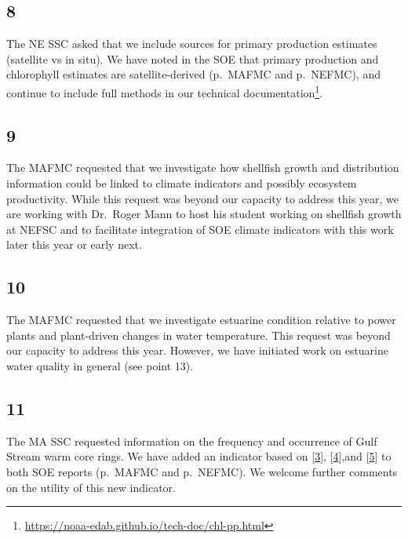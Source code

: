 \documentclass[
  10pt,
]{article}
\begin{document}
\hypertarget{section-7}{%
\subsection{8}\label{section-7}}

The NE SSC asked that we include sources for primary production
estimates (satellite vs in situ). We have noted in the SOE that primary
production and chlorophyll estimates are satellite-derived (p.~MAFMC and
p.~NEFMC), and continue to include full methods in our technical
documentation\footnote{\url{https://noaa-edab.github.io/tech-doc/chl-pp.html}}.

\hypertarget{section-8}{%
\subsection{9}\label{section-8}}

The MAFMC requested that we investigate how shellfish growth and
distribution information could be linked to climate indicators and
possibly ecosystem productivity. While this request was beyond our
capacity to address this year, we are working with Dr.~Roger Mann to
host his student working on shellfish growth at NEFSC and to facilitate
integration of SOE climate indicators with this work later this year or
early next.

\hypertarget{section-9}{%
\subsection{10}\label{section-9}}

The MAFMC requested that we investigate estuarine condition relative to
power plants and plant-driven changes in water temperature. This request
was beyond our capacity to address this year. However, we have initiated
work on estuarine water quality in general (see point 13).

\hypertarget{section-10}{%
\subsection{11}\label{section-10}}

The MA SSC requested information on the frequency and occurrence of Gulf
Stream warm core rings. We have added an indicator based on
{[}\protect\hyperlink{ref-andres_recent_2016}{3}{]},
{[}\protect\hyperlink{ref-gawarkiewicz_changing_2018}{4}{]},and
{[}\protect\hyperlink{ref-gangopadhyay_observed_2019}{5}{]} to both SOE
reports (p.~MAFMC and p.~NEFMC). We welcome further comments on the
utility of this new indicator.
\end{document}
